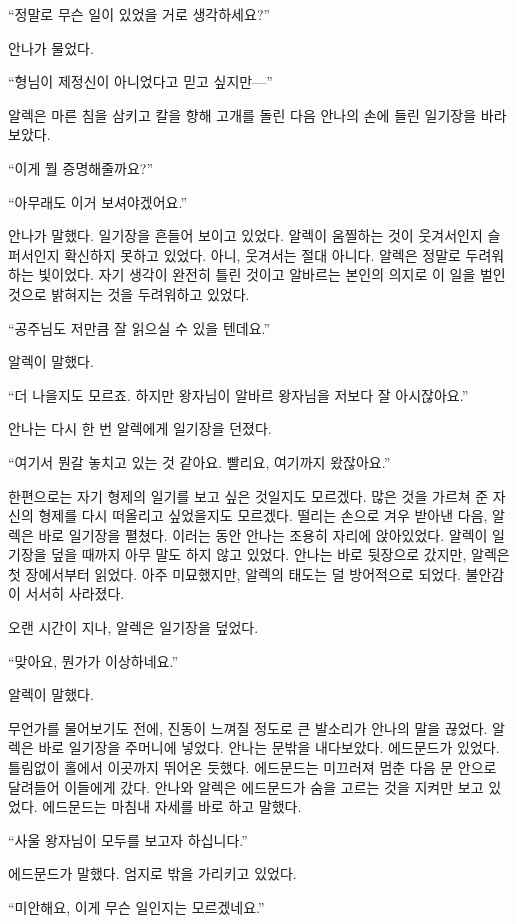 ``정말로 무슨 일이 있었을 거로 생각하세요?''

안나가 물었다.

`` 형님이 제정신이 아니었다고 믿고 싶지만—''

알렉은 마른 침을 삼키고 칼을 향해 고개를 돌린 다음 안나의 손에 들린 일기장을 바라보았다.

``이게 뭘 증명해줄까요?''

``아무래도 이거 보셔야겠어요.''

안나가 말했다. 일기장을 흔들어 보이고 있었다. 알렉이 움찔하는 것이 웃겨서인지 슬퍼서인지 확신하지 못하고 있었다. 아니, 웃겨서는 절대 아니다. 알렉은 정말로 두려워하는 빛이었다. 자기 생각이 완전히 틀린 것이고 알바르는 본인의 의지로 이 일을 벌인 것으로 밝혀지는 것을 두려워하고 있었다.

``공주님도 저만큼 잘 읽으실 수 있을 텐데요.''

알렉이 말했다.

``더 나을지도 모르죠. 하지만 왕자님이 알바르 왕자님을 저보다 잘 아시잖아요.''

안나는 다시 한 번 알렉에게 일기장을 던졌다.

``여기서 뭔갈 놓치고 있는 것 같아요. 빨리요, 여기까지 왔잖아요.''

한편으로는 자기 형제의 일기를 보고 싶은 것일지도 모르겠다. 많은 것을 가르쳐 준 자신의 형제를 다시 떠올리고 싶었을지도 모르겠다. 떨리는 손으로 겨우 받아낸 다음, 알렉은 바로 일기장을 펼쳤다. 이러는 동안 안나는 조용히 자리에 앉아있었다. 알렉이 일기장을 덮을 때까지 아무 말도 하지 않고 있었다. 안나는 바로 뒷장으로 갔지만, 알렉은 첫 장에서부터 읽었다. 아주 미묘했지만, 알렉의 태도는 덜 방어적으로 되었다. 불안감이 서서히 사라졌다.

오랜 시간이 지나, 알렉은 일기장을 덮었다.

``맞아요, 뭔가가 이상하네요.''

알렉이 말했다.

무언가를 물어보기도 전에, 진동이 느껴질 정도로 큰 발소리가 안나의 말을 끊었다. 알렉은 바로 일기장을 주머니에 넣었다. 안나는 문밖을 내다보았다. 에드문드가 있었다. 틀림없이 홀에서 이곳까지 뛰어온 듯했다. 에드문드는 미끄러져 멈춘 다음 문 안으로 달려들어 이들에게 갔다. 안나와 알렉은 에드문드가 숨을 고르는 것을 지켜만 보고 있었다. 에드문드는 마침내 자세를 바로 하고 말했다.

``사울 왕자님이 모두를 보고자 하십니다.''

에드문드가 말했다. 엄지로 밖을 가리키고 있었다.

``미안해요, 이게 무슨 일인지는 모르겠네요.''

